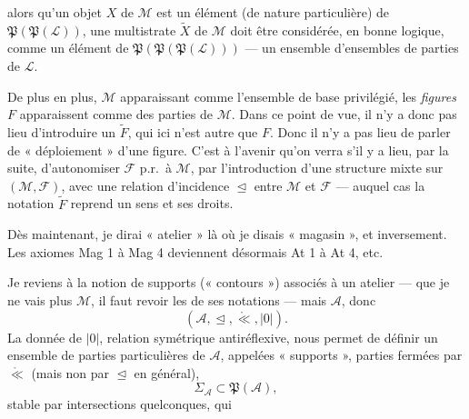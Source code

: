 \documentclass[11pt,a4paper]{article}
\begin{document}
alors qu'un objet $X$ de $\mathcal{M}$ est un \struck{\ill{}} élément (de nature particulière) de $\mathfrak{P}(\mathfrak{P}(\mathcal{L}))$, une multistrate $\widetilde{X}$ de $\mathcal{M}$ doit être considérée, en bonne logique, comme un élément de $\mathfrak{P}(\mathfrak{P}(\mathfrak{P}(\mathcal{L})))$ — un ensemble d'ensembles de parties de $\mathcal{L}$.

De plus en plus, $\mathcal{M}$ apparaissant comme l'ensemble de base privilégié, les \textit{figures} $F$ apparaissent comme des parties de $\mathcal{M}$. Dans ce point de vue, il n'y a donc pas lieu d'introduire un $\widetilde{F}$, qui ici n'est autre que $F$. Donc il n'y a pas lieu de parler de « déploiement » d'une figure. C'est à l'avenir qu'on verra s'il y a lieu, par la suite, d'autonomiser $\mathcal{F}$ p.r.\ à $\mathcal{M}$, par l'introduction d'une structure mixte sur $(\mathcal{M},\mathcal{F})$, avec une relation d'incidence $\trianglelefteq$ entre $\mathcal{M}$ et $\mathcal{F}$ — auquel cas la notation $\widetilde{F}$ reprend un sens et ses droits.

Dès maintenant, je dirai « atelier » là où je disais « magasin », et inversement. Les axiomes Mag 1 à Mag 4 deviennent désormais At 1 à At 4, etc.

Je reviens à la notion de supports (« contours ») associés à un atelier — que je ne vais plus  $\mathcal{M}$, il faut revoir les  de ses notations — mais $\mathcal{A}$, donc
\[
  (\mathcal{A},\trianglelefteq,\mathring{\ll},|0|).
\]
La donnée de $|0|$, relation symétrique antiréflexive, nous permet de définir un ensemble de parties particulières de $\mathcal{A}$, appelées « supports », parties fermées par $\mathring{\ll}$ (mais non par $\trianglelefteq$ en général), 
\[
  \Sigma_{\mathcal{A}}\subset\mathfrak{P}(\mathcal{A}),
\]
stable par intersections quelconques, qui
\end{document}
